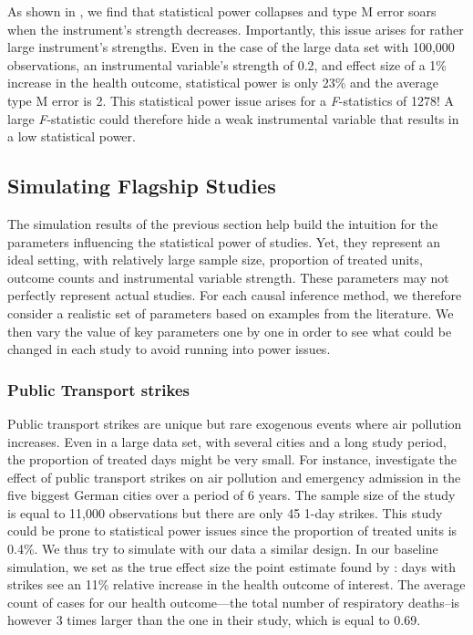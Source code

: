 \documentclass[12pt]{article}
\begin{document}
            As shown in , we find that statistical power collapses and type M error soars when the instrument's strength decreases. Importantly, this issue arises for rather large instrument's strengths. Even in the case of the large data set with 100,000 observations, an instrumental variable's strength of 0.2, and effect size of a 1\% increase in the health outcome, statistical power is only 23\% and the average type M error is 2. This statistical power issue arises for a \textit{F}-statistics of 1278!  A large \textit{F}-statistic could therefore hide a weak instrumental variable that results in a low statistical power.
            
        \subsection{Simulating Flagship Studies}

            The simulation results of the previous section help build the intuition for the parameters influencing the statistical power of studies. Yet, they represent an ideal setting, with relatively large sample size, proportion of treated units, outcome counts and instrumental variable strength. These parameters may not perfectly represent actual studies. For each causal inference method, we therefore consider a realistic set of parameters based on examples from the literature. We then vary the value of key parameters one by one in order to see what could be changed in each study to avoid running into power issues.
        
        \subsubsection*{Public Transport strikes}
        
            Public transport strikes are unique but rare exogenous events where air pollution increases. Even in a large data set, with several cities and a long study period, the proportion of treated days might be very small. For instance, \cite{bauernschuster_when_2017} investigate the effect of public transport strikes on air pollution and emergency admission in the five biggest German cities over a period of 6 years. The sample size of the study is equal to 11,000 observations but there are only 45 1-day strikes. This study could be prone to statistical power issues since the proportion of treated units is 0.4\%. We thus try to simulate with our data a similar design. In our baseline simulation, we set as the true effect size the point estimate found by \cite{bauernschuster_when_2017}: days with strikes see an 11\% relative increase in the health outcome of interest. The average count of cases for our health outcome---the total number of respiratory deaths--is however 3 times larger than the one in their study, which is equal to 0.69.
            
\end{document}
